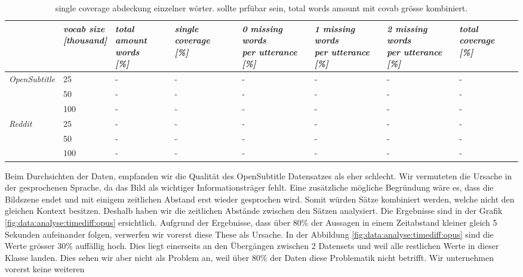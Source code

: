 \begin{table}[H]
	\begin{adjustbox}{max width=\textwidth}
	\centering
	\small
	\begin{tabular}{llllllll}
		\toprule
		&  \specialcell{\emph{vocab size}	\\\textit{[thousand]}}
		&  \specialcell{\emph{total amount}\\\emph{words} \\\textit{[\%]}}
		&  \specialcell{\emph{single coverage} \\\textit{[\%]}}
		&  \specialcell{\emph{0 missing words}\\\emph{per utterance} \\\textit{[\%]}}
		&  \specialcell{\emph{1 missing words}\\\emph{per utterance} \\\textit{[\%]}}
		&  \specialcell{\emph{2 missing words}\\\emph{per utterance} \\\textit{[\%]}}
		&  \specialcell{\emph{total coverage} \\\textit{[\%]}}\\
		\midrule
		\emph{OpenSubtitle}			&25		&-	&-	&-	&-	&-	&-\\
							&50		&-	&-	&-	&-	&-	&-\\
							&100	&-	&-	&-	&-	&-	&-\\
		\emph{Reddit}		&25		&-	&-	&-	&-	&-	&-\\
							&50		&-	&-	&-	&-	&-	&-\\
							&100	&-	&-	&-	&-	&-	&-\\
		\bottomrule
	\end{tabular}
	\end{adjustbox}
	\caption{single coverage abdeckung einzelner wörter. sollte prfübar sein, total words amount mit covab grösse kombiniert.}
	\label{tbl:data:split:corpus:analyze}
\end{table}

Beim Durchsichten der Daten, empfanden wir die Qualität des OpenSubtitle Datensatzes als eher schlecht. Wir vermuteten die Ursache in der gesprochenen Sprache, da das Bild als wichtiger Informationsträger fehlt. Eine zusätzliche mögliche Begründung wäre es, dass die Bildszene endet und mit einigem zeitlichen Abstand erst wieder gesprochen wird. Somit würden Sätze kombiniert werden, welche nicht den gleichen Kontext besitzen. Deshalb haben wir die zeitlichen Abstände zwischen den Sätzen analysiert. Die Ergebnisse sind in der Grafik \ref{fig:data:analyse:timediff:opus} ersichtlich. Aufgrund der Ergebnisse, dass über 80\% der Aussagen in einem Zeitabstand kleiner gleich 5 Sekunden aufeinander folgen, verwerfen wir vorerst diese These als Ursache. In der Abbildung \ref{fig:data:analyse:timediff:opus} sind die Werte grösser 30\% auffällig hoch. Dies liegt einerseits an den Übergängen zwischen 2 Datensets und weil alle restlichen Werte in dieser Klasse landen. Dies sehen wir aber nicht als Problem an, weil über 80\% der Daten diese Problematik nicht betrifft.
Wir unternehmen vorerst keine weiteren 

